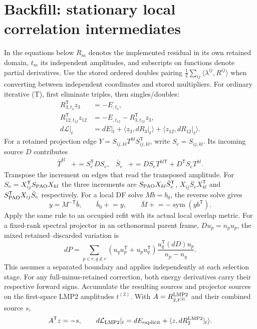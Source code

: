 \documentclass[11pt]{article}
\newcommand{\T}{^{\mathsf T}}
\newcommand{\sym}{\operatorname{sym}}
\newcommand{\ip}[2]{\langle #1,#2\rangle}
\begin{document}
\section{Backfill: stationary local correlation intermediates}
In the equations below $R_m$ denotes the implemented residual in its own
retained domain, $t_m$ its independent amplitudes, and subscripts on
functions denote partial derivatives. Use the stored ordered doubles
pairing $\tfrac12\sum_{ij}\langle\lambda^{ij},R^{ij}\rangle$ when
converting between independent coordinates and stored multipliers.
For ordinary iterative (T), first eliminate triples, then singles/doubles:
\begin{align}
 R_{3,t_3}\T z_3&=-E_{,t_3},\\
 R_{12,t_{12}}\T z_{12}&=-E_{,t_{12}}-R_{3,t_{12}}\T z_3,\\
 d\mathcal L|_{t}&=dE|_t+\ip{z_3}{dR_3|_t}+\ip{z_{12}}{dR_{12}|_t}.
\end{align}
For a retained projection edge $Y=S_{ij,kl}T^{kl}S_{ij,kl}\T$,
write $S_e=S_{ij,kl}$. Its incoming source $D$ contributes
\begin{align}
 \bar T^{kl}&\mathrel{+}=S_e\T D S_e,&
 \bar S_e&\mathrel{+}=D S_e T^{kl\mathsf T}+D\T S_e T^{kl}.
\end{align}
Transpose the increment on edges that read the transposed amplitude.
For $S_e=X_{ij}\T S_{\rm PAO}X_{kl}$ the three increments are
$S_{\rm PAO}X_{kl}\bar S_e\T$, $X_{ij}\bar S_e X_{kl}\T$ and
$S_{\rm PAO}\T X_{ij}\bar S_e$ respectively.
For a local DF solve $Mb=b_0$, the reverse solve gives
\begin{equation}
 y=M^{-\mathsf T}\bar b,\qquad \bar b_0\mathrel{+}=y,\qquad
 \bar M\mathrel{+}=-\sym(y b\T).
\end{equation}
Apply the same rule to an occupied refit with its actual local overlap metric.
For a fixed-rank spectral projector in an orthonormal parent frame,
$D u_p=n_p u_p$, the mixed retained--discarded variation is
\begin{equation}
 dP=\sum_{p\in r,q\notin r}
 (u_q u_p\T+u_p u_q\T)
 \frac{u_q\T(dD)u_p}{n_p-n_q}.
\end{equation}
This assumes a separated boundary and applies independently at each
selection stage. For any full-minus-retained correction, both energy
derivatives carry their respective forward signs. Accumulate the resulting
sources and projector sources on the first-space LMP2 amplitudes $t^{(2)}$.
With $A=R_{2,t^{(2)}}^{\rm LMP2}$ and their combined source $s$,
\begin{equation}
 A\T z=-s,\qquad d\mathcal L_{\rm LMP2}|_t
 =dE_{\rm explicit}+\ip z{dR^{\rm LMP2}_2|_t}.
\end{equation}
\end{document}

